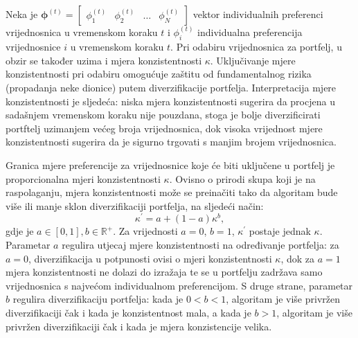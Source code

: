 \documentclass[lmodern, utf8, diplomski, numeric]{fer}
\newcommand{\matr}[1]{\mathbold{#1}}
\begin{document}
  Neka je $\matr{\phi}^{\left(t\right)} = \begin{bmatrix} \phi_1^{\left(t\right)} & \phi_2^{\left(t\right)} & \ldots & \phi_N^{\left(t\right)} \end{bmatrix}$ vektor individualnih preferenci vrijednosnica u vremenskom koraku $t$ i $\phi_i^{\left(t\right)}$ individualna preferencija vrijednosnice $i$ u vremenskom koraku $t$.
  Pri odabiru vrijednosnica za portfelj, u obzir se također uzima i mjera konzistentnosti $\kappa$.
  Uključivanje mjere konzistentnosti pri odabiru omogućuje zaštitu od fundamentalnog rizika (propadanja neke dionice) putem diverzifikacije portfelja.
  Interpretacija mjere konzistentnosti je sljedeća: niska mjera konzistentnosti sugerira da procjena u sadašnjem vremenskom koraku nije pouzdana, stoga je bolje diverzificirati portftelj uzimanjem većeg broja vrijednosnica, dok visoka vrijednost mjere konzistentnosti sugerira da je sigurno trgovati s manjim brojem vrijednosnica.
    
  Granica mjere preferencije za vrijednosnice koje će biti uključene u portfelj je proporcionalna mjeri konzistentnosti $\kappa$.
  Ovisno o prirodi skupa koji je na raspolaganju, mjera konzistentnosti može se preinačiti tako da algoritam bude više ili manje sklon diverzifikaciji portfelja, na sljedeći način:
  \begin{equation}
  \kappa^\prime = a + (1 - a)\kappa^b,
  \end{equation}
  gdje je $a \in [0, 1], b \in \mathbb{R}^+$.
  Za vrijednosti $a = 0$, $b = 1$, $\kappa^\prime$ postaje jednak $\kappa$.
  Parametar $a$ regulira utjecaj mjere konzistentnosti na određivanje portfelja: za $a = 0$, diverzifikacija u potpunosti ovisi o mjeri konzistentnosti $\kappa$, dok za $a = 1$ mjera konzistentnosti ne dolazi do izražaja te se u portfelju zadržava samo vrijednosnica s najvećom individualnom preferencijom.
  S druge strane, parametar $b$ regulira diverzifikaciju portfelja: kada je $0 < b < 1$, algoritam je više privržen diverzifikaciji čak i kada je konzistentnost mala, a kada je $b > 1$, algoritam je više privržen diverzifikaciji čak i kada je mjera konzistencije velika.
  
\end{document}
